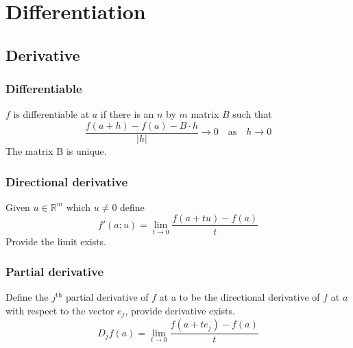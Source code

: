 \section{Differentiation}

\subsection{Derivative}
\label{derivative}

\subsubsection{Differentiable}
$f$ is differentiable at $a$ if there is an $n$ by $m$ matrix $B$ such that
			\[\frac{f(a+h)-f(a)-B\cdot h}{|h|}\to 0
			\quad\textrm{as}\quad h \to 0\]
		The matrix B is unique.

\subsubsection{Directional derivative}
Given $u\in \mathbb{R}^m$ which $u\neq 0$ define
		\[f'(a;u)=\lim_{t\to 0} \frac{f(a+tu)-f(a)}{t}\]
		Provide the limit exists.

\subsubsection{Partial derivative}
Define the $j^\textrm{th}$ partial derivative of $f$ at a
		to be the directional derivative of $f$ at $a$ with
		respect to the vector $e_j$, provide derivative exists.
		\[D_jf(a)=\lim_{t\to 0}\frac{f(a+te_j)-f(a)}{t}\]

